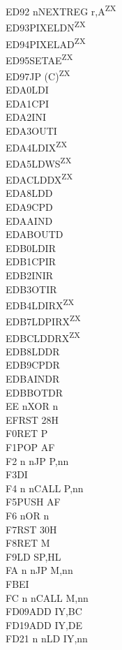 \documentclass[oneside,a4paper]{book}
\begin{document}
\begin{multicols}{3}
{\begin{tabbing}
ED92 n\>NEXTREG r,A\textsuperscript{ZX}\\
ED93\>PIXELDN\textsuperscript{ZX}\\
ED94\>PIXELAD\textsuperscript{ZX}\\
ED95\>SETAE\textsuperscript{ZX}\\
ED97\>JP (C)\textsuperscript{ZX}\\
EDA0\>LDI\\
EDA1\>CPI\\
EDA2\>INI\\
EDA3\>OUTI\\
EDA4\>LDIX\textsuperscript{ZX}\\
EDA5\>LDWS\textsuperscript{ZX}\\
EDAC\>LDDX\textsuperscript{ZX}\\
EDA8\>LDD\\
EDA9\>CPD\\
EDAA\>IND\\
EDAB\>OUTD\\
EDB0\>LDIR\\
EDB1\>CPIR\\
EDB2\>INIR\\
EDB3\>OTIR\\
EDB4\>LDIRX\textsuperscript{ZX}\\
EDB7\>LDPIRX\textsuperscript{ZX}\\
EDBC\>LDDRX\textsuperscript{ZX}\\
EDB8\>LDDR\\
EDB9\>CPDR\\
EDBA\>INDR\\
EDBB\>OTDR\\
EE n\>XOR n\\
EF\>RST 28H\\
F0\>RET P\\
F1\>POP AF\\
F2 n n\>JP P,nn\\
F3\>DI\\
F4 n n\>CALL P,nn\\
F5\>PUSH AF\\
F6 n\>OR n\\
F7\>RST 30H\\
F8\>RET M\\
F9\>LD SP,HL\\
FA n n\>JP M,nn\\
FB\>EI\\
FC n n\>CALL M,nn\\
FD09\>ADD IY,BC\\
FD19\>ADD IY,DE\\
FD21 n n\>LD IY,nn\\

\end{tabbing}}
\end{multicols}
\end{document}
